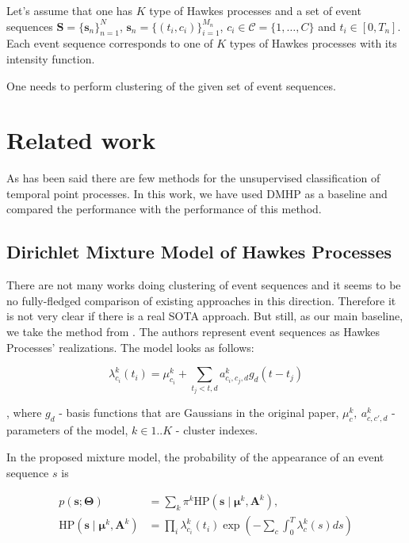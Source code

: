 \documentclass[10pt]{article}
\begin{document}
Let's assume that one has $K$ type of Hawkes processes and a set of event sequences $\mathbf{S} = \{\mathbf{s}_n\}_{n=1}^N$, $\mathbf{s}_n = \{(t_i,c_i)\}_{i=1}^{M_n}$, $c_i \in \mathcal{C} = \{1,\dots,C\}$ and $t_i \in [0,T_n]$. Each event sequence corresponds to one of $K$ types of Hawkes processes with its intensity function.

One needs to perform clustering of the given set of event sequences.

\section{Related work}\label{sec:related}

As has been said there are few methods for the unsupervised classification of temporal point processes. In this work, we have used DMHP as a baseline and compared the performance with the performance of this method.

\subsection{Dirichlet Mixture Model of Hawkes Processes}\label{sec:dmhp}
There are not many works doing clustering of event sequences and it seems to be no fully-fledged comparison of existing approaches in this direction. Therefore it is not very clear if there is a real SOTA approach. But still, as our main baseline, we take the method from \cite{123dirichlet}. The authors represent event sequences as Hawkes Processes' realizations. The model looks as follows:

\begin{equation}
\lambda_{c_i}^k(t_i) = \mu_{c_i}^k + \sum_{t_j<t, d}a_{c_i,c_j,d}^kg_d(t-t_j)
\end{equation}

, where $g_d$ - basis functions that are Gaussians in the original paper, $\mu_{c}^k,~a_{c,c',d}^k$ - parameters of the model, $k\in 1..K$ - cluster indexes.

In the proposed mixture model, the probability of the appearance of an event sequence $s$ is

\begin{align}
p(\boldsymbol{s} ; \boldsymbol{\Theta})&=\sum_{k} \pi^{k} \mathrm{HP}\left(\boldsymbol{s} \mid \boldsymbol{\mu}^{k}, \boldsymbol{A}^{k}\right), \\ \mathrm{HP}\left(\boldsymbol{s} \mid \boldsymbol{\mu}^{k}, \boldsymbol{A}^{k}\right)&=\prod_{i} \lambda_{c_{i}}^{k}\left(t_{i}\right) \exp \left(-\sum_{c} \int_{0}^{T} \lambda_{c}^{k}(s) d s\right)
\end{align}
\end{document}
